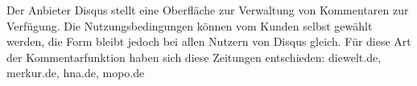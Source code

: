 Der Anbieter Disqus stellt eine Oberfläche zur Verwaltung von Kommentaren zur Verfügung. 
Die Nutzungsbedingungen können vom Kunden selbst gewählt werden, die Form bleibt jedoch 
bei allen Nutzern von Disqus gleich. Für diese Art der Kommentarfunktion haben sich diese
Zeitungen entschieden: diewelt.de, merkur.de, hna.de, mopo.de









  \\\midrule




